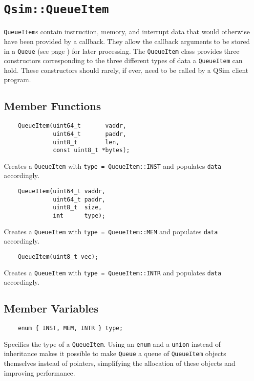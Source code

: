 \documentclass[letterpaper, 10pt]{book}
\begin{document}
\newpage

\section{\texttt{Qsim::QueueItem}} \label{struct:QueueItem}
\texttt{QueueItem}s contain instruction, memory, and interrupt data that would
otherwise have been provided by a callback. They allow the callback arguments
to be stored in a \texttt{Queue} (see page \pageref{class:Queue}) for later
processing. The \texttt{QueueItem} class provides three constructors
corresponding to the three different types of data a \texttt{QueueItem} can
hold. These constructors should rarely, if ever, need to be called by a QSim
client program.

\subsection{Member Functions}
\begin{verbatim}
    QueueItem(uint64_t       vaddr,
              uint64_t       paddr,
              uint8_t        len,
              const uint8_t *bytes);
\end{verbatim}
Creates a \texttt{QueueItem} with \texttt{type = QueueItem::INST} and populates
\texttt{data} accordingly.

\begin{verbatim}
    QueueItem(uint64_t vaddr, 
              uint64_t paddr, 
              uint8_t  size, 
              int      type);
\end{verbatim}
Creates a \texttt{QueueItem} with \texttt{type = QueueItem::MEM} and populates
\texttt{data} accordingly.

\begin{verbatim}
    QueueItem(uint8_t vec);
\end{verbatim}
Creates a \texttt{QueueItem} with \texttt{type = QueueItem::INTR} and populates
\texttt{data} accordingly.

\subsection{Member Variables}
\begin{verbatim}
    enum { INST, MEM, INTR } type;
\end{verbatim}
Specifies the type of a \texttt{QueueItem}. Using an \texttt{enum} and a 
\texttt{union} instead of inheritance makes it possible to make \texttt{Queue}
a queue of \texttt{QueueItem} objects themselves instead of pointers, 
simplifying the allocation of these objects and improving performance.
\end{document}
